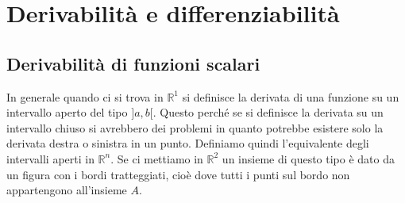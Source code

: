 \section{Derivabilità e differenziabilità}

\subsection{Derivabilità di funzioni scalari}
In generale quando ci si trova in $\mathbb{R}^1$ si definisce la derivata di 
una funzione su un intervallo aperto del tipo $]a, b[$. Questo perché se si 
definisce la derivata su un intervallo chiuso si avrebbero dei problemi in 
quanto potrebbe esistere solo la derivata destra o sinistra in un punto. 
Definiamo quindi l'equivalente degli intervalli aperti in $\mathbb{R}^n$.
Se ci mettiamo in $\mathbb{R}^2$ un insieme di questo tipo è dato da un figura 
con i bordi tratteggiati, cioè dove tutti i punti sul bordo non appartengono 
all'insieme $A$. %

